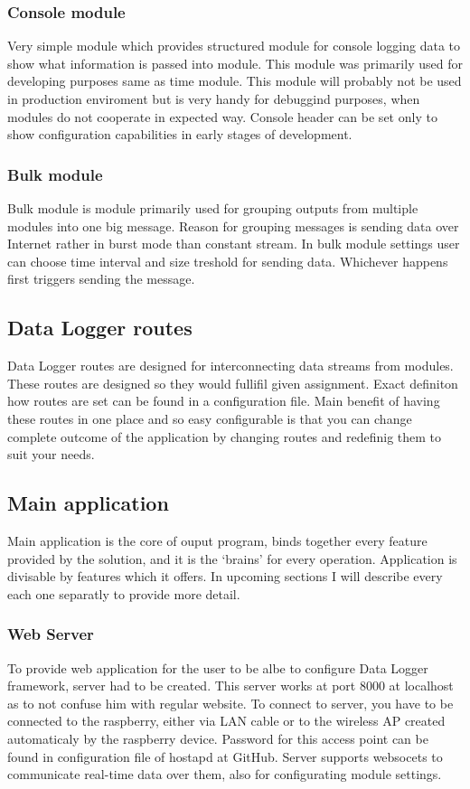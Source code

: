 \subsubsection{Console module} %
\label{ssub:console_module}
Very simple module which provides structured module for console logging data to show what information is passed into module. This module was primarily used for developing purposes same as time module. This module will probably not be used in production enviroment but is very handy for debuggind purposes, when modules do not cooperate in expected way. Console header can be set only to show configuration capabilities in early stages of development.
\subsubsection{Bulk module} %
Bulk module is module primarily used for grouping outputs from multiple modules into one big message. Reason for grouping messages is sending data over Internet rather in burst mode than constant stream. In bulk module settings user can choose time interval and size treshold for sending data. Whichever happens first triggers sending the message.
\label{ssub:bulk_module}
\subsection{Data Logger routes} %
\label{sub:data_logger_routes}
Data Logger routes are designed for interconnecting data streams from modules. These routes are designed so they would fullifil given assignment. Exact definiton how routes are set can be found in a configuration file. Main benefit of having these routes in one place and so easy configurable is that you can change complete outcome of the application by changing routes and redefinig them to suit your needs.
\subsection{Main application} %
\label{sub:main_application}
Main application is the core of ouput program, binds together every feature provided by the solution, and it is the `brains' for every operation. Application is divisable by features which it offers. In upcoming sections I will describe every each one separatly to provide more detail.
\subsubsection{Web Server} %
\label{ssub:web_server}
To provide web application for the user to be albe to configure Data Logger framework, server had to be created. This server works at port 8000 at localhost as to not confuse him with regular website. To connect to server, you have to be connected to the raspberry, either via LAN cable or to the wireless AP created automaticaly by the raspberry device. Password for this access point can be found in configuration file of hostapd at GitHub. Server supports websocets to communicate real-time data over them, also  for configurating module settings.
